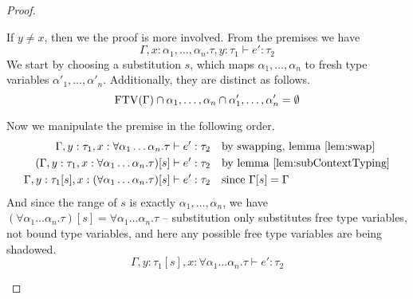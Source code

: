 \begin{proof}
\begin{description}
    If $y \ne x$, then we the proof is more involved. From the premises
    we have
    \[\Gamma , x : \alpha_1,\ldots,\alpha_n . \tau , y : \tau_1 \vdash e' : \tau_2\]
    We start by choosing a substitution $s$, which maps $\alpha_1 , \ldots, \alpha_n$
    to fresh type variables $\alpha'_1, \ldots,\alpha'_n$. Additionally, they are
    distinct as follows.
    \[\operatorname{FTV}(\Gamma) \cap \alpha_1,\ldots,\alpha_n \cap \alpha'_1,\ldots,\alpha'_n = \emptyset\]

    Now we manipulate the premise in the following order.
    \begin{align*}
      \Gamma , y : \tau_1 , x : \forall\alpha_1\ldots\alpha_n . \tau &\vdash e' : \tau_2 && \text{by swapping,
                                                   lemma~\ref{lem:swap}}
      \\
      (\Gamma , y : \tau_1 , x : \forall\alpha_1\ldots\alpha_n . \tau)[s] &\vdash e' : \tau_2 && \text{by
                                                     lemma~\ref{lem:subContextTyping}}
      \\
      \Gamma , y : \tau_1[s] , x : (\forall\alpha_1\ldots\alpha_n . \tau)[s] &\vdash e' : \tau_2 &&
                                                            \text{since
                                                            } \Gamma[s] = \Gamma
    \end{align*}
    And since the range of $s$ is exactly $\alpha_1,\ldots,\alpha_n$, we have
    $(\forall \alpha_1\ldots\alpha_n . \tau)[s] = \forall \alpha_1\ldots\alpha_n . \tau$ -- substitution only
    substitutes free type variables, not bound type variables, and
    here any possible free type variables are being shadowed.
    \begin{equation}
      \Gamma , y : \tau_1[s] , x : \forall \alpha_1\ldots\alpha_n . \tau \vdash e' : \tau_2
      \label{eq:substAbs2}
    \end{equation}


\end{description}
\end{proof}
